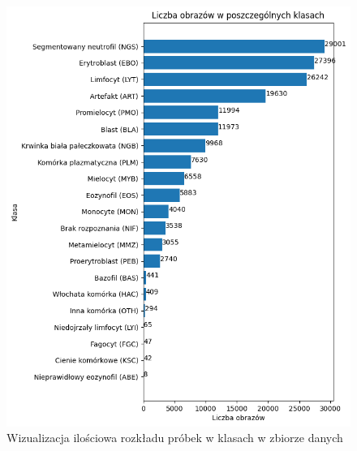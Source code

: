 \begin{figure}
    \includegraphics[width=\textwidth]{images_count}
    \caption{Wizualizacja ilościowa rozkładu próbek w klasach w zbiorze danych}
    \label{fig:images_count_vis}
\end{figure}

